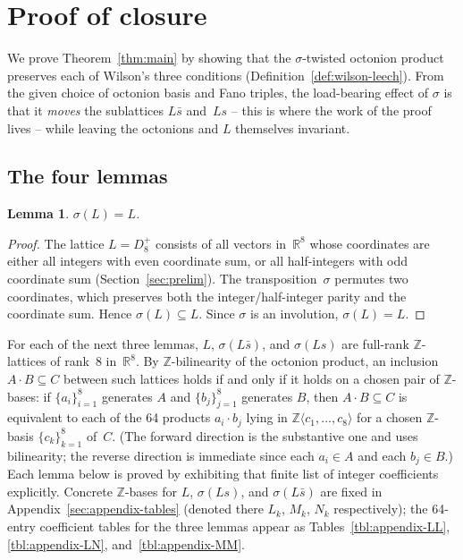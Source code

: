 \documentclass[twoside,english]{paper}
\numberwithin{equation}{section}
\numberwithin{figure}{section}
\newtheorem{lemma}[theorem]{Lemma}
\theoremstyle{definition}
\theoremstyle{remark}
\newcommand{\RR}{\mathbb{R}}
\newcommand{\ZZ}{\mathbb{Z}}
\begin{document}
\section{Proof of closure}\label{sec:proof}

We prove Theorem~\ref{thm:main} by showing that the $\sigma$-twisted
octonion product preserves each of Wilson's three conditions
(Definition~\ref{def:wilson-leech}).  From
the given choice of octonion basis and Fano triples, the
load-bearing effect of $\sigma$ is that it \emph{moves} the
sublattices $L\bar s$ and~$Ls$ -- this is where the work of the
proof lives -- while leaving the octonions and $L$ themselves
invariant.

\subsection{The four lemmas}

\begin{lemma}\label{lem:sigma-L}
$\sigma(L) = L$.
\end{lemma}

\begin{proof}
The lattice $L = D_8^+$ consists of all vectors in~$\RR^8$ whose
coordinates are either all integers with even coordinate sum, or all
half-integers with odd coordinate sum (Section~\ref{sec:prelim}).  The
transposition~$\sigma$ permutes two coordinates, which preserves both
the integer/half-integer parity and the coordinate sum.  Hence
$\sigma(L) \subseteq L$.  Since $\sigma$ is an involution,
$\sigma(L) = L$.
\end{proof}

For each of the next three lemmas, $L$, $\sigma(L\bar s)$, and
$\sigma(Ls)$ are full-rank $\ZZ$-lattices of rank~$8$ in~$\RR^8$.  By
$\ZZ$-bilinearity of the octonion product, an inclusion $A \cdot B
\subseteq C$ between such lattices holds if and only if it holds on a
chosen pair of $\ZZ$-bases: if $\{a_i\}_{i=1}^8$ generates $A$ and
$\{b_j\}_{j=1}^8$ generates $B$, then $A\cdot B \subseteq C$ is
equivalent to each of the 64 products $a_i\cdot b_j$ lying in
$\ZZ\langle c_1,\ldots,c_8\rangle$ for a chosen $\ZZ$-basis
$\{c_k\}_{k=1}^8$ of~$C$.  (The forward direction is the substantive
one and uses bilinearity; the reverse direction is immediate
since each $a_i\in A$ and each $b_j\in B$.)  Each lemma below is
proved by exhibiting that finite list of integer coefficients
explicitly.  Concrete
$\ZZ$-bases for $L$, $\sigma(Ls)$, and $\sigma(L\bar s)$ are fixed in
Appendix~\ref{sec:appendix-tables} (denoted there $L_k$, $M_k$, $N_k$
respectively); the 64-entry coefficient tables for the three
lemmas appear as Tables~\ref{tbl:appendix-LL},
\ref{tbl:appendix-LN}, and~\ref{tbl:appendix-MM}.
\end{document}
